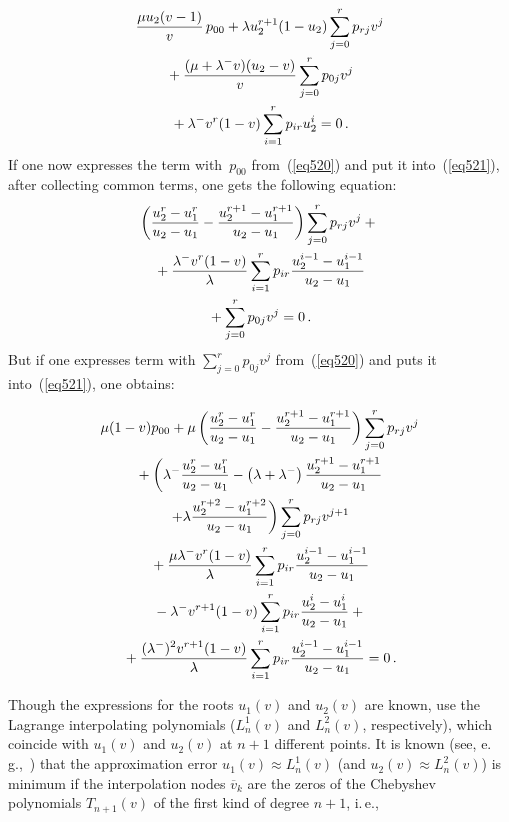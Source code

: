 \begin{multicols}{2}
\noindent
\begin{multline}
\label{eq521}
\displaystyle\frac{\displaystyle \mu u_2 (v-1)\mathstrut}{\displaystyle v\mathstrut}\, p_{00} + \lambda u_2^{r+1} (1-u_2) \sum\limits_{j=0}^{r} p_{rj} v^j
 \\
{}+ \displaystyle\frac{\displaystyle (\mu + \lambda^- v)(u_2-v)\mathstrut}{\displaystyle v\mathstrut} \sum\limits_{j=0}^{r} p_{0j} v^j\\
{} +
\lambda^- v^r (1-v) \sum\limits_{i=1}^{r} p_{ir} u_2^i =0\,.
\end{multline}
If one now expresses the term with~$p_{00}$ from~(\ref{eq520})
and put it into~(\ref{eq521}), after collecting common terms,
one gets the following equation:
\begin{multline}
\label{eq522}
\left (
\displaystyle\frac{\displaystyle u_2^r -u_1^r \mathstrut}{\displaystyle u_2 - u_1\mathstrut} -
\displaystyle\frac{\displaystyle u_2^{r+1} -u_1^{r+1}\mathstrut}{\displaystyle u_2 - u_1\mathstrut} \right ) \sum\limits_{j=0}^{r} p_{rj} v^j +{}
\\
{}+
\displaystyle\frac{\displaystyle \lambda^- v^r (1-v)\mathstrut}{\displaystyle \lambda \mathstrut} \sum\limits_{i=1}^{r} p_{ir} 
\displaystyle\frac{\displaystyle u_2^{i-1} -u_1^{i-1}\mathstrut}{\displaystyle u_2 - u_1\mathstrut}\\
{} +\sum\limits_{j=0}^{r} p_{0j} v^j = 0\,.
\end{multline}
But if one expresses term with
$\sum_{j=0}^{r} p_{0j} v^j$ from~(\ref{eq520}) and puts it into~(\ref{eq521}), one obtains:

\noindent
\begin{multline}
\label{eq523}
\mu (1-v)p_{00} + \mu \left (
\displaystyle\frac{\displaystyle u^r_2 - u^r_1 \mathstrut}{\displaystyle u_2-u_1\mathstrut} -
\displaystyle\frac{\displaystyle u^{r+1}_2 - u^{r+1}_1\mathstrut}{\displaystyle u_2-u_1\mathstrut} \right ) \sum\limits_{j=0}^{r} p_{rj} v^j  \\
{}+ \left (
\lambda^- \displaystyle\frac{\displaystyle u^r_2 - u^r_1\mathstrut}{\displaystyle  u_2-u_1\mathstrut} -
\left(\lambda + \lambda^-\right)\displaystyle\frac{\displaystyle u^{r+1}_2 - u^{r+1}_1\mathstrut}{\displaystyle u_2-u_1\mathstrut}\right.\\
\left. +
\lambda \displaystyle\frac{\displaystyle u^{r+2}_2 - u^{r+2}_1\mathstrut}{\displaystyle u_2-u_1\mathstrut} \right) 
\sum\limits_{j=0}^{r} p_{rj} v^{j+1}
\\
{}+ \displaystyle\frac{\displaystyle \mu \lambda^- v^r (1-v)\mathstrut}{\displaystyle \lambda\mathstrut}
\sum\limits_{i=1}^{r} p_{ir} \displaystyle\frac{\displaystyle u_2^{i-1} - u_1^{i-1} \mathstrut}{\displaystyle  u_2-u_1\mathstrut}\\
{}- \lambda^- v^{r+1} (1-v) \sum\limits_{i=1}^{r} p_{ir} 
\displaystyle\frac{\displaystyle u_2^{i} - u_1^{i}\mathstrut}{\displaystyle u_2-u_1\mathstrut} + {} \\
{}+ \displaystyle\frac{\displaystyle (\lambda^-)^2 v^{r+1} (1-v)\mathstrut}{\displaystyle \lambda\mathstrut}
\sum\limits_{i=1}^{r} p_{ir} \displaystyle\frac{\displaystyle  u_2^{i-1} - u_1^{i-1} \mathstrut}{\displaystyle u_2-u_1\mathstrut} = 0\,.
\end{multline}

Though the expressions for the roots $u_{1}(v)$ and $u_{2}(v)$ are known,
use the  Lagrange interpolating polynomials ($L^1_{n}(v)$ and $L^2_{n}(v)$,
respectively), which coincide with
$u_{1}(v)$ and $u_{2}(v)$ at $n+1$ different points.
It is known (see, e.\,g.,~\cite{suetin})
that the {approximation error $u_{1}(v) \approx L^1_{n}(v)$
(and $u_{2}(v) \approx L^2_{n}(v)$)}
is minimum if the interpolation nodes $\overline{v}_k$  are
the zeros of the Chebyshev polynomials $T_{n+1}(v)$ of the first kind
of degree $n+1$, i.\,e.,


\end{multicols}
